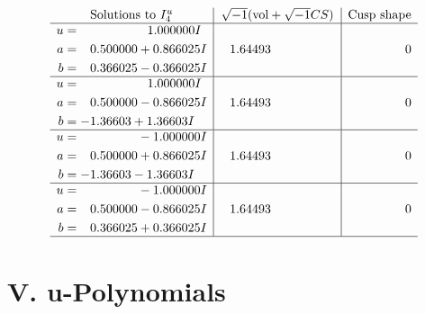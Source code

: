 \documentclass[1p]{elsarticle_modified}
\theoremstyle{definition}
\newcommand{\I}{\sqrt{-1}}
\begin{document}
$$\begin{array}{c|c|c}  
\text{Solutions to }I^u_{4}& \I (\text{vol} + \sqrt{-1}CS) & \text{Cusp shape}\\
 \hline 
\begin{aligned}
u &= \phantom{-0.000000 -}1.000000 I \\
a &= \phantom{-}0.500000 + 0.866025 I \\
b &= \phantom{-}0.366025 - 0.366025 I\end{aligned}
 & \phantom{-}1.64493\phantom{ +0.000000I} & \phantom{-0.000000 } 0 \\ \hline\begin{aligned}
u &= \phantom{-0.000000 -}1.000000 I \\
a &= \phantom{-}0.500000 - 0.866025 I \\
b &= -1.36603 + 1.36603 I\end{aligned}
 & \phantom{-}1.64493\phantom{ +0.000000I} & \phantom{-0.000000 } 0 \\ \hline\begin{aligned}
u &= \phantom{-0.000000 } -1.000000 I \\
a &= \phantom{-}0.500000 + 0.866025 I \\
b &= -1.36603 - 1.36603 I\end{aligned}
 & \phantom{-}1.64493\phantom{ +0.000000I} & \phantom{-0.000000 } 0 \\ \hline\begin{aligned}
u &= \phantom{-0.000000 } -1.000000 I \\
a &= \phantom{-}0.500000 - 0.866025 I \\
b &= \phantom{-}0.366025 + 0.366025 I\end{aligned}
 & \phantom{-}1.64493\phantom{ +0.000000I} & \phantom{-0.000000 } 0\\
 \hline 
 \end{array}$$\newpage
\newpage\renewcommand{\arraystretch}{1}
\centering \section*{ V. u-Polynomials}
\end{document}
